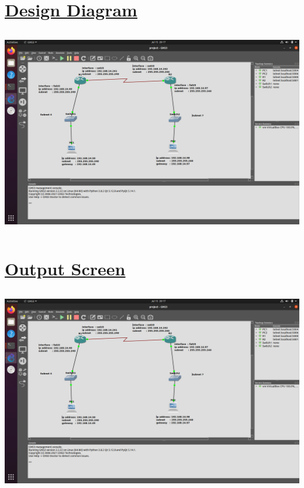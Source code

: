 \documentclass[a4paper]{report}
\begin{document}
    \section*{\underline{Design Diagram}}
    \includegraphics[width=14.4cm, height=9cm]{design.png}

    \section*{\underline{Output Screen}}
    \includegraphics[width=14.4cm, height=9cm]{design.png}

    
\end{document}
